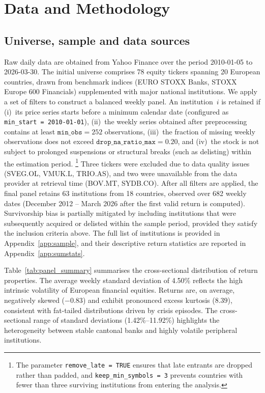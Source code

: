 \section{Data and Methodology}\label{sec:data_method}

\subsection{Universe, sample and data sources}

Raw daily data are obtained from Yahoo Finance over the period 2010-01-05 to
2026-03-30. The initial universe comprises 78 equity tickers spanning 20 European
countries, drawn from benchmark indices (EURO STOXX Banks, STOXX Europe 600 Financials)
supplemented with major national institutions. We apply a set of filters to construct a balanced weekly panel. An institution~$i$ is
retained if (i)~its price series starts before a minimum calendar date (configured as
\texttt{min\_start = 2010-01-01}), (ii)~the weekly series obtained after preprocessing
contains at least $\texttt{min\_obs} = 252$ observations, (iii)~the fraction of missing
weekly observations does not exceed $\texttt{drop\_na\_ratio\_max} = 0.20$, and
(iv)~the stock is not subject to prolonged suspensions or structural breaks (such as
delisting) within the estimation period.%
\footnote{The parameter \texttt{remove\_late = TRUE} ensures that late entrants are
dropped rather than padded, and \texttt{keep\_min\_symbols = 3} prevents countries with
fewer than three surviving institutions from entering the analysis.}
Three tickers were excluded due to data quality issues (SVEG.OL, VMUK.L, TRIO.AS), and
two were unavailable from the data provider at retrieval time (BOV.MT, SYDB.CO). After
all filters are applied, the final panel retains 63 institutions from 18 countries,
observed over 682 weekly dates (December 2012 -- March 2026 after the first valid
return is computed). Survivorship bias is partially mitigated by including institutions
that were subsequently acquired or delisted within the sample period, provided they
satisfy the inclusion criteria above. The full list of institutions is provided in
Appendix~\ref{app:sample}, and their descriptive return statistics are reported in
Appendix~\ref{app:sumstats}.

Table~\ref{tab:panel_summary} summarises the cross-sectional distribution of return
properties. The average weekly standard deviation of 4.50\% reflects the high intrinsic
volatility of European financial equities. Returns are, on average, negatively skewed
($-0.83$) and exhibit pronounced excess kurtosis ($8.39$), consistent with fat-tailed
distributions driven by crisis episodes. The cross-sectional range of standard deviations
(1.42\%--11.92\%) highlights the heterogeneity between stable cantonal banks and highly
volatile peripheral institutions.

